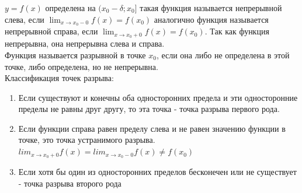 \documentclass[oneside]{book}
\begin{document}
\begin{enumerate}
$y = f(x)$ определена на $(x_0 - \delta; x_0]$ такая функция называется непрерывной слева, если $\lim_{x \rightarrow x_0 - 0}{f(x)} = f(x_0)$
аналогично функция называется непрерывной справа, если $\lim_{x \rightarrow x_0 + 0}{f(x)} = f(x_0)$. Так как функция непрерывна,
она непрерывна слева и справа. \\
Функция называется разрывной в точке $x_0$, если она либо не определена в этой точке, либо определена, но не непрерывна. \\
Классификация точек разрыва:
\begin{enumerate}
    \item Если существуют и конечны оба односторонних предела и эти односторонние пределы не равны друг другу, то эта точка - точка разрыва
          первого рода.
    \item Если функции справа равен пределу слева и не равен значению функции в точке, это точка устранимого разрыва.
          $lim_{x \rightarrow x_0+0}{f(x)} = lim_{x \rightarrow x_0-0}{f(x)} \neq f(x_0)$
    \item Если хотя бы один из односторонних пределов бесконечен или не существует - точка разрыва второго рода
\end{enumerate}


\end{enumerate}
\end{document}
